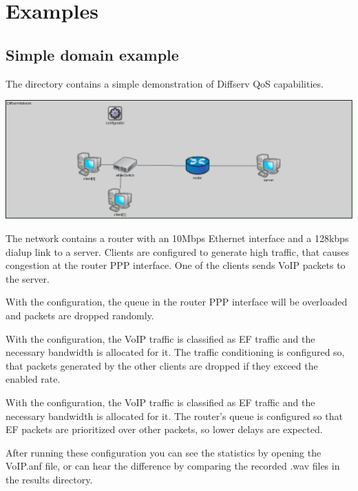 \section{Examples}


\subsection{Simple domain example}

The  directory contains a
simple demonstration of Diffserv QoS capabilities.

\begin{center}
\includegraphics[scale=0.3]{figures/SimpleDiffservNetwork.png}
\end{center}

The network contains a router with an 10Mbps Ethernet interface and a
128kbps dialup link to a server. Clients are configured to generate
high traffic, that causes congestion at the router PPP interface.
One of the clients sends VoIP packets to the server.

With the  configuration, the queue in the router PPP interface
will be overloaded and packets are dropped randomly.

With the  configuration, the VoIP traffic is classified as EF
traffic and the necessary bandwidth is allocated for it. The traffic conditioning
is configured so, that packets generated by the other clients are dropped if they
exceed the enabled rate.

With the  configuration, the VoIP traffic is classified as EF
traffic and the necessary bandwidth is allocated for it. The router's queue is configured
so that EF packets are prioritized over other packets, so lower delays are expected.

After running these configuration you can see the statistics by opening the
VoIP.anf file, or can hear the difference by comparing the recorded .wav files
in the results directory.

